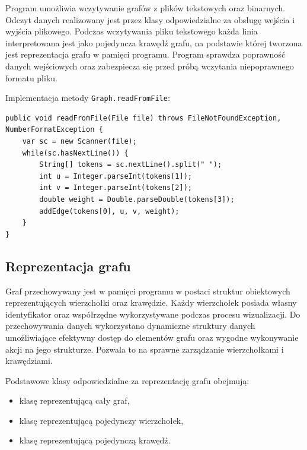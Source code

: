 \documentclass[11pt,a4paper]{article}
\begin{document}
Program umożliwia wczytywanie grafów z plików tekstowych oraz binarnych. Odczyt danych realizowany jest przez klasy odpowiedzialne za obsługę wejścia i wyjścia plikowego. Podczas wczytywania pliku tekstowego każda linia interpretowana jest jako pojedyncza krawędź grafu, na podstawie której tworzona jest reprezentacja grafu w pamięci programu. Program sprawdza poprawność danych wejściowych oraz zabezpiecza się przed próbą wczytania niepoprawnego formatu pliku.

\noindent{}Implementacja metody \verb|Graph.readFromFile|:

\begin{verbatim}
public void readFromFile(File file) throws FileNotFoundException, NumberFormatException {
    var sc = new Scanner(file);
    while(sc.hasNextLine()) {
        String[] tokens = sc.nextLine().split(" ");
        int u = Integer.parseInt(tokens[1]);
        int v = Integer.parseInt(tokens[2]);
        double weight = Double.parseDouble(tokens[3]);
        addEdge(tokens[0], u, v, weight);
    }
}
\end{verbatim}

\subsection{Reprezentacja grafu}

Graf przechowywany jest w pamięci programu w postaci struktur obiektowych reprezentujących wierzchołki oraz krawędzie. Każdy wierzchołek posiada własny identyfikator oraz współrzędne wykorzystywane podczas procesu wizualizacji. Do przechowywania danych wykorzystano dynamiczne struktury danych umożliwiające efektywny dostęp do elementów grafu oraz wygodne wykonywanie akcji na jego strukturze. Pozwala to na sprawne zarządzanie wierzchołkami i krawędziami.

Podstawowe klasy odpowiedzialne za reprezentację grafu obejmują:

\begin{itemize}
    \item klasę reprezentującą cały graf,
    \item klasę reprezentującą pojedynczy wierzchołek,
    \item klasę reprezentującą pojedynczą krawędź.
\end{itemize}
\end{document}
